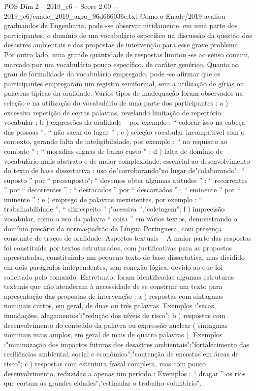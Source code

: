 \begin{textsample}{POS Dim 2 – 2019\_c6 – Score 2.00 – 2019\_c6/enade\_2019\_agro\_96d666036e.txt}
Como o Enade/2019 avaliou graduandos de Engenharia, pode -se observar nitidamente, em uma parte dos participantes, o domínio de um vocabulário específico na discussão da questão dos desastres ambientais e das propostas de intervenção para esse grave problema.
Por outro lado, uma grande quantidade de respostas limitou -se ao senso comum, marcado por um vocabulário pouco específico, de caráter genérico.
Quanto ao grau de formalidade do vocabulário empregado, pode -se afirmar que os participantes empregaram um registro semiformal, sem a utilização de gírias ou palavras típicas da oralidade.
Vários tipos de inadequação foram observados na seleção e na utilização do vocabulário de uma parte dos participantes : a ) excessiva repetição de certas palavras, revelando limitação de repertório vocabular ; b ) expressões da oralidade – por exemplo : “ colocar isso na cabeça das pessoas ”, “ não saem do lugar ” ; c ) seleção vocabular incompatível com o contexto, gerando falta de inteligibilidade, por exemplo : “ no requisito ao combate ” ; “ moradias dignas de baixo custo ” ; d ) falta de domínio de vocabulário mais abstrato e de maior complexidade, essencial ao desenvolvimento do texto de base dissertativa : uso de"corroborando"no lugar de"colaborando"; “ suposto ” por “ pressuposto"; “ devemos obter algumas atitudes ” ; “ recorrentes ” por “ decorrentes ” ; “ destacados ” por “ descartados ” ; “ eminente ” por “ iminente ” ; e ) emprego de palavras inexistentes, por exemplo : “ trabalhabilidade ”, “ dizrespeito ” ;"acessiva ”,"coletagem"; f ) imprecisão vocabular, como o uso da palavra “ coisa ” em vários textos, demonstrando o domínio precário da norma-padrão da Língua Portuguesa, com presença constante de traços de oralidade.
Aspectos textuais – A maior parte das respostas foi constituída por textos estruturados, com justificativas para as propostas apresentadas, constituindo um pequeno texto de base dissertativa, mas dividido em dois parágrafos independentes, sem conexão lógica, devido ao que foi solicitado pelo comando.
Entretanto, foram identificadas algumas estruturas textuais que não atenderam à necessidade de se construir um texto para apresentação das propostas de intervenção : a ) respostas com sintagmas nominais curtos, em geral, de duas ou três palavras.
Exemplos :"secas, inundações, alagamentos";"redução dos níveis de risco"; b ) respostas com desenvolvimento do conteúdo da palavra ou expressão nuclear ( sintagmas nominais mais amplos, em geral de mais de quatro palavras ).
Exemplos :"minimização dos impactos futuros dos desastres ambientais";"fortalecimento das resiliências ambiental, social e econômica";"contenção de encostas em áreas de risco"; c ) respostas com estrutura frasal completa, mas com pouco desenvolvimento, reduzidas a apenas um período : Exemplos : “ dragar ” os rios que cortam as grandes cidades";"estimular o trabalho voluntário".

\end{textsample}
